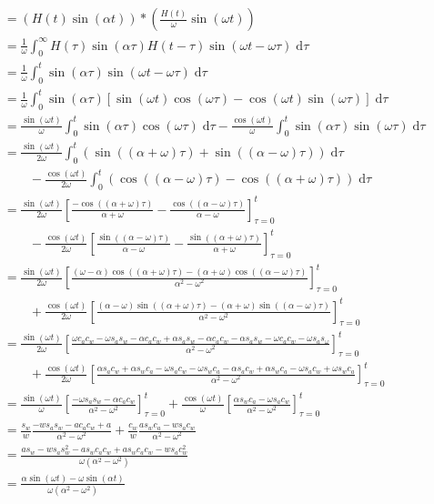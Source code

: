\documentclass{article}
\newcommand{\diff}{\;\mathrm{d}}
\begin{document}
\begin{enumerate}
\begin{enumerate}
				\begin{align*}
					&=(H(t)\sin(\alpha t))\ast \left(\frac{H(t)}{\omega}\sin(\omega t)\right)\\
					&= \frac{1}{\omega}\int_0^\infty H(\tau)\sin(\alpha \tau)H(t-\tau)\sin(\omega t-\omega \tau)\diff \tau\\
					&=\frac{1}{\omega}\int_0^t \sin(\alpha\tau)\sin(\omega t-\omega\tau)\diff \tau\\
					&=\frac{1}{\omega}\int_0^t \sin(\alpha\tau)\left[\sin(\omega t)\cos(\omega \tau)-\cos(\omega t)\sin(\omega\tau)\right]\diff\tau\\
					&=\frac{\sin(\omega t)}{\omega}\int_0^t \sin(\alpha \tau)\cos(\omega \tau)\diff\tau - \frac{\cos(\omega t)}{\omega}\int_0^t \sin(\alpha \tau)\sin(\omega \tau)\diff \tau\\
					&=\frac{\sin(\omega t)}{2\omega}\int_0^t (\sin((\alpha  +\omega) \tau)+\sin((\alpha-\omega) \tau))\diff\tau\\
					&\qquad- \frac{\cos(\omega t)}{2\omega}\int_0^t (\cos((\alpha -\omega)\tau) - \cos((\alpha+\omega)\tau))\diff\tau\\
					&=\frac{\sin(\omega t)}{2\omega}\left[\frac{-\cos((\alpha+\omega)\tau)}{\alpha + \omega} - \frac{\cos((\alpha-\omega)\tau)}{\alpha-\omega}\right]_{\tau =0}^t\\
					&\qquad -\frac{\cos(\omega t)}{2\omega}\left[\frac{\sin((\alpha-\omega)\tau)}{\alpha-\omega}-\frac{\sin((\alpha+\omega)\tau)}{\alpha+\omega}\right]_{\tau=0}^t\\
					&=\frac{\sin(\omega t)}{2\omega}\left[\frac{(\omega-\alpha)\cos((\alpha+\omega)\tau)-(\alpha+\omega)\cos((\alpha-\omega)\tau)}{\alpha^2-\omega^2}\right]_{\tau=0}^t\\
					&\qquad +\frac{\cos(\omega t)}{2\omega}\left[\frac{(\alpha-\omega)\sin((\alpha+\omega)\tau)-(\alpha+\omega)\sin((\alpha-\omega)\tau)}{\alpha^2-\omega^2}\right]_{\tau=0}^t\\
					&=\frac{\sin(\omega t)}{2\omega}\left[\frac{\omega c_ac_w -\omega s_as_w - \alpha c_ac_w + \alpha s_as_w - \alpha c_ac_w-\alpha s_as_w-\omega c_ac_w - \omega s_as_\omega}{\alpha^2-\omega^2}\right]_{\tau=0}^t\\
					&\qquad +\frac{\cos(\omega t)}{2\omega}\left[\frac{\alpha s_ac_w + \alpha s_wc_a - \omega s_ac_w - \omega s_wc_a - \alpha s_ac_w + \alpha s_wc_a -\omega s_ac_w + \omega s_wc_a}{\alpha^2-\omega^2}\right]_{\tau=0}^t\\
					&=\frac{\sin(\omega t)}{\omega}\left[\frac{ -\omega s_as_w - \alpha c_ac_w }{\alpha^2-\omega^2}\right]_{\tau=0}^t +\frac{\cos(\omega t)}{\omega}\left[\frac{\alpha s_wc_a - \omega s_ac_w}{\alpha^2-\omega^2}\right]_{\tau=0}^t\\
					&= \frac{s_w}{w}\frac{-ws_as_w - a c_ac_w + a}{\alpha^2-\omega^2} + \frac{c_w}{w}\frac{as_wc_a - ws_ac_w}{\alpha^2-\omega^2}\\
					&=\frac{as_w -ws_as_w^2 - as_wc_ac_w + as_wc_ac_w - ws_ac_w^2}{\omega(\alpha^2-\omega^2)}\\
					&=\frac{\alpha\sin(\omega t)-\omega\sin(\alpha t)}{\omega(\alpha^2-\omega^2)}
				\end{align*}
				

\end{enumerate}
\end{enumerate}
\end{document}

